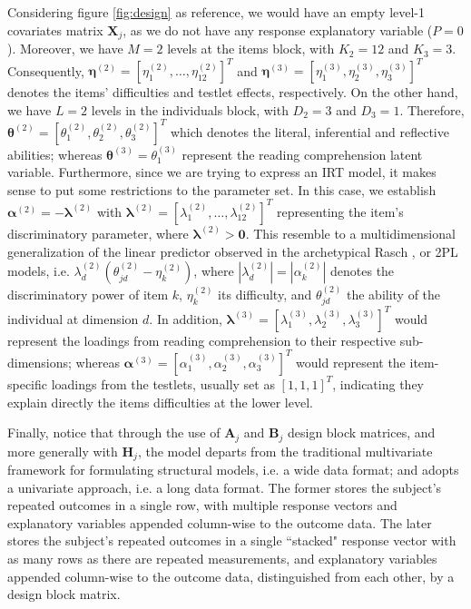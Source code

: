Considering figure \ref{fig:design} as reference, we would have an empty level-1 covariates matrix $\mathbf{X}_{j}$, as we do not have any response explanatory variable ($P=0$). Moreover, we have $M=2$ levels at the items block, with $K_{2}=12$ and $K_{3}=3$. Consequently, $\pmb{\eta}^{(2)} = [ \eta_{1}^{(2)}, \dots, \eta_{12}^{(2)} ]^{T}$ and $\pmb{\eta}^{(3)} = [ \eta_{1}^{(3)}, \eta_{2}^{(3)}, \eta_{3}^{(3)} ]^{T}$ denotes the items' difficulties and testlet effects, respectively. On the other hand, we have $L=2$ levels in the individuals block, with $D_{2}=3$ and $D_{3}=1$. Therefore, $\pmb{\theta}^{(2)} = [ \theta_{1}^{(2)}, \theta_{2}^{(2)}, \theta_{3}^{(2)} ]^{T}$ which denotes the literal, inferential and reflective abilities; whereas $\pmb{\theta}^{(3)} = \theta_{1}^{(3)}$ represent the reading comprehension latent variable. Furthermore, since we are trying to express an IRT model, it makes sense to put some restrictions to the parameter set. In this case, we establish $\pmb{\alpha}^{(2)} = -\pmb{\lambda}^{(2)}$ with $ \pmb{\lambda}^{(2)} = [ \lambda_{1}^{(2)}, \dots, \lambda_{12}^{(2)} ]^{T}$ representing the item's discriminatory parameter, where $\pmb{\lambda}^{(2)} > \mathbf{0}$. This resemble to a multidimensional generalization of the linear predictor observed in the archetypical Rasch \cite{Rasch_1980}, or 2PL \cite{Lord_et_al_2008} models, i.e. $ \lambda^{(2)}_{d} (\theta^{(2)}_{jd} - \eta^{(2)}_{k} )$, where $| \lambda^{(2)}_{d} | = | \alpha^{(2)}_{k} |$ denotes the discriminatory power of item $k$, $\eta^{(2)}_{k}$ its difficulty, and $\theta^{(2)}_{jd}$ the ability of the individual at dimension $d$. In addition, $\pmb{\lambda}^{(3)} = [ \lambda_{1}^{(3)}, \lambda_{2}^{(3)}, \lambda_{3}^{(3)} ]^{T}$ would represent the loadings from reading comprehension to their respective sub-dimensions; whereas $\pmb{\alpha}^{(3)} = [ \alpha_{1}^{(3)}, \alpha_{2}^{(3)}, \alpha_{3}^{(3)} ]^{T}$ would represent the item-specific loadings from the testlets, usually set as $[1,1,1]^{T}$, indicating they explain directly the items difficulties at the lower level.

Finally, notice that through the use of $\mathbf{A}_{j}$ and $\mathbf{B}_{j}$ design block matrices, and more generally with $\mathbf{H}_{j}$, the model departs from the traditional multivariate framework for formulating structural models, i.e. a wide data format; and adopts a univariate approach, i.e. a long data format. The former stores the subject’s repeated outcomes in a single row, with multiple response vectors and explanatory variables appended column-wise to the outcome data. The later stores the subject’s repeated outcomes in a single ``stacked" response vector with as many rows as there are repeated measurements, and explanatory variables appended column-wise to the outcome data, distinguished from each other, by a design block matrix. 


